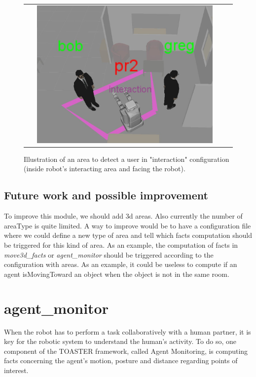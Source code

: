 \documentclass[a4paper]{article}
\begin{document}
 \begin{figure}[ht!]
 \centering
 \begin{tabular}{cc}
  \includegraphics[width=0.90\textwidth]{img/interactionarea.jpg}
 \end{tabular}
 \caption{Illustration of an area to detect a user in "interaction" configuration (inside robot's interacting area and facing the robot).}
 \label{fig:interactionarea}
 \end{figure}

\subsection{Future work and possible improvement}
To improve this module, we should add 3d areas.
Also currently the number of areaType is quite limited. A way to improve would be to have a configuration file where we could define a new type of area and tell which facts computation should be triggered for this kind of area.
As an example, the computation of facts in \textit{move3d\_facts} or \textit{agent\_monitor} should be triggered according to the configuration with areas. As an example, it could be useless to compute if an agent isMovingToward an object when the object is not in the same room.

\section{agent\_monitor}

When the robot has to perform a task collaboratively with a human partner, it is key for the robotic system to understand the human's activity. To do so, one component of the TOASTER framework, called Agent Monitoring, is computing facts concerning the agent's motion, posture and distance regarding points of interest.
\end{document}
